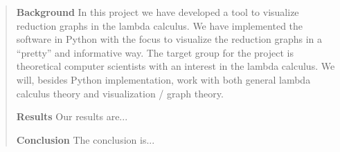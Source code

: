 
\begin{abstract}

\textbf{Background} In this project we have developed a tool to visualize
reduction graphs in the lambda calculus. We have implemented the software in
Python with the focus to visualize the reduction graphs in a ``pretty'' and
informative way. The target group for the project is theoretical computer
scientists with an interest in the lambda calculus. We will, besides Python
implementation, work with both general lambda calculus theory and
visualization / graph theory.

\textbf{Results} Our results are...

\textbf{Conclusion} The conclusion is...

\end{abstract}